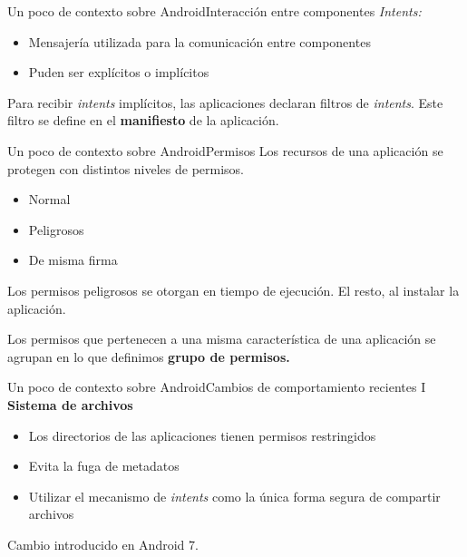\documentclass[pdf, handout]{beamer} %
\begin{document}
\begin{frame}{Un poco de contexto sobre Android}{Interacción entre componentes}
    \textit{Intents:} \\
    \begin{itemize}
        \item Mensajería utilizada para la comunicación entre componentes \pause
        \item Puden ser explícitos o implícitos
    \end{itemize}
    \vspace{20px} \pause
    Para recibir \textit{intents} implícitos, las aplicaciones declaran filtros de \textit{intents}.
    Este filtro se define en el \textbf{manifiesto} de la aplicación.
\end{frame}

\begin{frame}{Un poco de contexto sobre Android}{Permisos}
    Los recursos de una aplicación se protegen con distintos niveles de permisos.
    \begin{itemize}[<+->]
        \item Normal
        \item Peligrosos
        \item De misma firma
    \end{itemize}
    \vspace{20px} \pause Los permisos peligrosos se  otorgan en tiempo de ejecución. El resto, al
    instalar la aplicación.

    \vspace{20px} \pause Los permisos que pertenecen a una misma característica de una aplicación
    se agrupan en lo que definimos \textbf{grupo de permisos.}
\end{frame}

\begin{frame}{Un poco de contexto sobre Android}{Cambios de comportamiento recientes I}
    \textbf{Sistema de archivos}\\
    \vspace{10px}
    \begin{itemize}
        \item Los directorios de las aplicaciones tienen permisos restringidos
        \item Evita la fuga de metadatos
        \item Utilizar el mecanismo de \textit{intents} como la única forma segura de compartir
              archivos
    \end{itemize}
    \vspace{10px}
    \pause
    Cambio introducido en Android 7.
\end{frame}
\end{document}
